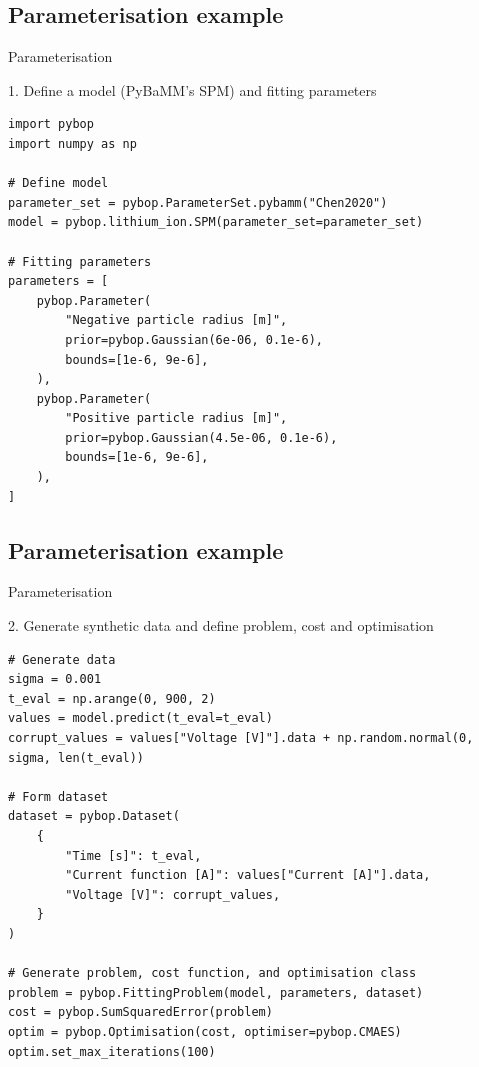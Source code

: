 \documentclass[aspectratio=169]{beamer} %
\begin{document}
\subsection{Parameterisation example}
\begin{frame}[fragile,t]{Parameterisation}
    \vspace{-0.5cm}
    \begin{block}{1. Define a model (PyBaMM's SPM) and fitting parameters}
    \begin{lstlisting}[firstnumber=1, xleftmargin=10pt]
import pybop
import numpy as np

# Define model
parameter_set = pybop.ParameterSet.pybamm("Chen2020")
model = pybop.lithium_ion.SPM(parameter_set=parameter_set)

# Fitting parameters
parameters = [
    pybop.Parameter(
        "Negative particle radius [m]",
        prior=pybop.Gaussian(6e-06, 0.1e-6),
        bounds=[1e-6, 9e-6],
    ),
    pybop.Parameter(
        "Positive particle radius [m]",
        prior=pybop.Gaussian(4.5e-06, 0.1e-6),
        bounds=[1e-6, 9e-6],
    ),
]
    \end{lstlisting}
    \end{block}
\end{frame}

\subsection{Parameterisation example}
\begin{frame}[fragile,t]{Parameterisation}
    \vspace{-0.5cm}
    \begin{block}{2. Generate synthetic data and define problem, cost and optimisation}
    \begin{lstlisting}[firstnumber=1, xleftmargin=10pt]
# Generate data
sigma = 0.001
t_eval = np.arange(0, 900, 2)
values = model.predict(t_eval=t_eval)
corrupt_values = values["Voltage [V]"].data + np.random.normal(0, sigma, len(t_eval))

# Form dataset
dataset = pybop.Dataset(
    {
        "Time [s]": t_eval,
        "Current function [A]": values["Current [A]"].data,
        "Voltage [V]": corrupt_values,
    }
)

# Generate problem, cost function, and optimisation class
problem = pybop.FittingProblem(model, parameters, dataset)
cost = pybop.SumSquaredError(problem)
optim = pybop.Optimisation(cost, optimiser=pybop.CMAES)
optim.set_max_iterations(100)
    \end{lstlisting}
    \end{block}
\end{frame}
\end{document}
